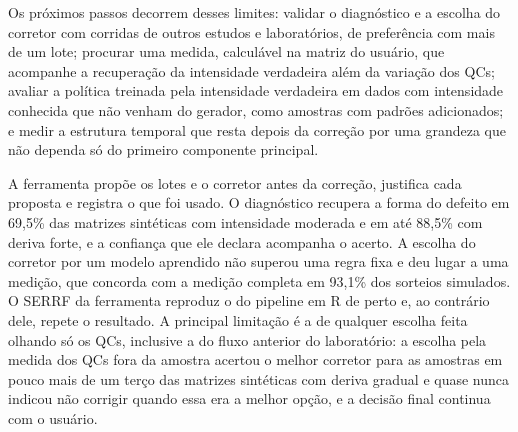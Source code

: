 Os próximos passos decorrem desses limites: validar o diagnóstico e a escolha do corretor com corridas de outros estudos e laboratórios, de preferência com mais de um lote; procurar uma medida, calculável na matriz do usuário, que acompanhe a recuperação da intensidade verdadeira além da variação dos QCs; avaliar a política treinada pela intensidade verdadeira em dados com intensidade conhecida que não venham do gerador, como amostras com padrões adicionados; e medir a estrutura temporal que resta depois da correção por uma grandeza que não dependa só do primeiro componente principal.

A ferramenta propõe os lotes e o corretor antes da correção, justifica cada proposta e registra o que foi usado. O diagnóstico recupera a forma do defeito em 69,5\% das matrizes sintéticas com intensidade moderada e em até 88,5\% com deriva forte, e a confiança que ele declara acompanha o acerto. A escolha do corretor por um modelo aprendido não superou uma regra fixa e deu lugar a uma medição, que concorda com a medição completa em 93,1\% dos sorteios simulados. O SERRF da ferramenta reproduz o do pipeline em R de perto e, ao contrário dele, repete o resultado. A principal limitação é a de qualquer escolha feita olhando só os QCs, inclusive a do fluxo anterior do laboratório: a escolha pela medida dos QCs fora da amostra acertou o melhor corretor para as amostras em pouco mais de um terço das matrizes sintéticas com deriva gradual e quase nunca indicou não corrigir quando essa era a melhor opção, e a decisão final continua com o usuário.
